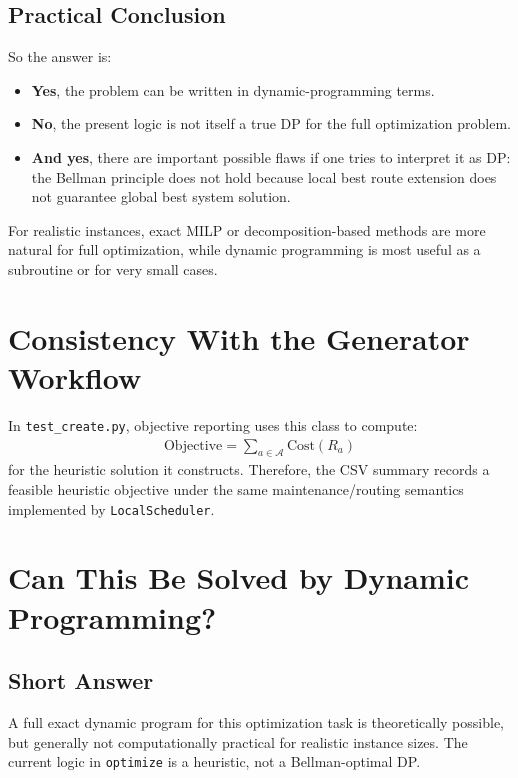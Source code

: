 \documentclass[11pt,a4paper]{article}
\begin{document}
\subsection{Practical Conclusion}
So the answer is:
\begin{itemize}[leftmargin=1.4em]
    \item \textbf{Yes}, the problem can be written in dynamic-programming terms.
    \item \textbf{No}, the present logic is not itself a true DP for the full optimization problem.
    \item \textbf{And yes}, there are important possible flaws if one tries to interpret it as DP: the Bellman principle does not hold because local best route extension does not guarantee global best system solution.
\end{itemize}

For realistic instances, exact MILP or decomposition-based methods are more natural for full optimization, while dynamic programming is most useful as a subroutine or for very small cases.

\section{Consistency With the Generator Workflow}
In \texttt{test\_create.py}, objective reporting uses this class to compute:
\begin{align*}
\text{Objective} = \sum_{a \in \mathcal{A}} \text{Cost}(R_a)
\end{align*}
for the heuristic solution it constructs. Therefore, the CSV summary records a feasible heuristic objective under the same maintenance/routing semantics implemented by \texttt{LocalScheduler}.

\section{Can This Be Solved by Dynamic Programming?}

\subsection{Short Answer}
A full exact dynamic program for this optimization task is theoretically possible, but generally not computationally practical for realistic instance sizes. The current logic in \texttt{optimize} is a heuristic, not a Bellman-optimal DP.
\end{document}
